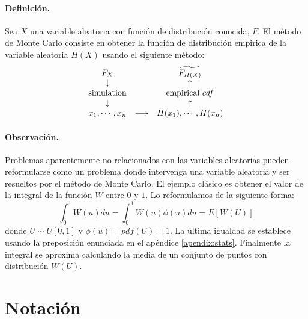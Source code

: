 \paragraph{Definici\'on.} Sea $X$ una variable aleatoria con funci\'on de 
distribuci\'on conocida, $F$. El m\'etodo de Monte Carlo consiste en 
obtener la funci\'on de distribuci\'on empirica de la variable aleatoria 
$H(X)$ usando el siguiente m\'etodo:
\begin{displaymath}
\begin{array}{ccc}
F_X                  &     \quad         & \widetilde{F_{H(X)}}   \cr
\downarrow         &     \quad         & \uparrow                \cr
\textrm{simulation} &     \quad         & \textrm{empirical } cdf \cr
\downarrow         &     \quad         & \uparrow                \cr
x_1,\cdots,x_n      & \longrightarrow & H(x_1),\cdots,H(x_n)  
\end{array}
\end{displaymath}

\paragraph{Observaci\'on.} Problemas aparentemente no relacionados con las 
variables aleatorias pueden reformularse como un problema donde intervenga
una variable aleatoria y ser resueltos por el m\'etodo de Monte Carlo. El 
ejemplo cl\'asico es obtener el valor de la integral de la funci\'on $W$ entre 
$0$ y $1$. Lo reformulamos de la siguiente forma:
\begin{displaymath}
\int_{0}^{1} W(u) du = \int_{0}^{1} W(u) \phi(u) du = E[W(U)]
\end{displaymath}
donde $U \sim U[0,1]$ y $\phi(u) = pdf(U) = 1$. La \'ultima igualdad se establece 
usando la preposici\'on enunciada en el ap\'endice \ref{apendix:stats}. 
Finalmente la integral se aproxima calculando la media de un conjunto de puntos 
con distribuci\'on $W(U)$.



\section{Notaci\'on}


